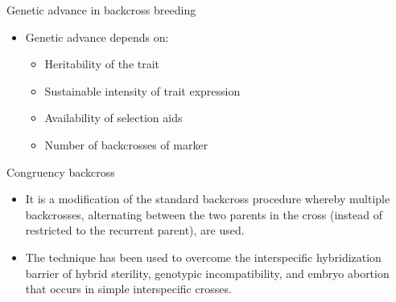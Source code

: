 \documentclass[11pt,ignorenonframetext,aspectratio=169]{beamer}
\providecommand{\tightlist}{%
  \setlength{\itemsep}{0pt}\setlength{\parskip}{0pt}}
\begin{document}
\begin{frame}{Genetic advance in backcross breeding}
\protect\hypertarget{genetic-advance-in-backcross-breeding}{}
\begin{itemize}
\tightlist
\item
  Genetic advance depends on:

  \begin{itemize}
  \tightlist
  \item
    Heritability of the trait
  \item
    Sustainable intensity of trait expression
  \item
    Availability of selection aids
  \item
    Number of backcrosses of marker
  \end{itemize}
\end{itemize}
\end{frame}

\begin{frame}{Congruency backcross}
\protect\hypertarget{congruency-backcross}{}
\begin{itemize}
\tightlist
\item
  It is a modification of the standard backcross procedure whereby
  multiple backcrosses, alternating between the two parents in the cross
  (instead of restricted to the recurrent parent), are used.
\item
  The technique has been used to overcome the interspecific
  hybridization barrier of hybrid sterility, genotypic incompatibility,
  and embryo abortion that occurs in simple interspecific crosses.
\end{itemize}
\end{frame}
\end{document}

